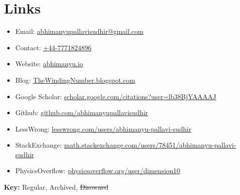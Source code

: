 \documentclass{article}
\newcommand{\disown}[1]{\sout{#1}}
\newcommand{\archive}{\color{lightgray}}
\begin{document}
\section*{Links}

\begin{itemize}
    \item Email: \href{mailto:abhimanyupallavisudhir@gmail.com}{abhimanyupallavisudhir@gmail.com}
    \item Contact: \href{tel:+44-7771824896}{+44-7771824896}
    \item Website: \href{https://abhimanyu.io/}{abhimanyu.io}
    \item Blog: \href{https://thewindingnumber.blogspot.com/}{TheWindingNumber.blogspot.com}
    \item Google Scholar: \href{https://scholar.google.com/citations?user=lb38BjYAAAAJ&hl=en}{scholar.google.com/citations?user=lb38BjYAAAAJ}
    \item Github: \href{https://github.com/abhimanyupallavisudhir}{github.com/abhimanyupallavisudhir}
    \item LessWrong: \href{https://www.lesswrong.com/users/abhimanyu-pallavi-sudhir}{lesswrong.com/users/abhimanyu-pallavi-sudhir}
    \item StackExchange: \href{https://math.stackexchange.com/users/78451/abhimanyu-pallavi-sudhir}{math.stackexchange.com/users/78451/abhimanyu-pallavi-sudhir}
    \item {\archive PhysicsOverflow: \href{https://physicsoverflow.org/user/dimension10}{physicsoverflow.org/user/dimension10}}
\end{itemize}


\vspace{1em}

\textbf{Key:} Regular, {\archive Archived}, {\archive \disown{Disowned}}
\end{document}
